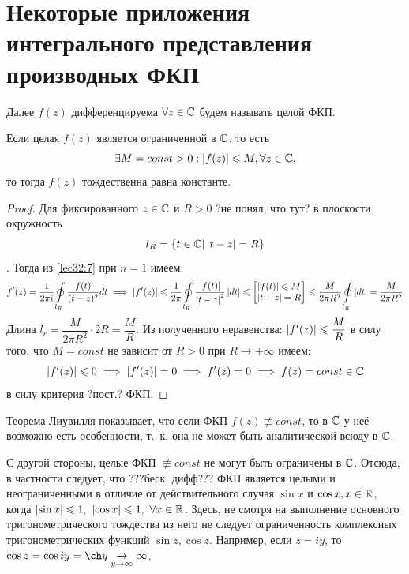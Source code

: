 \documentclass[../../main.tex]{subfiles}
\begin{document}
\section{Некоторые приложения интегрального
	представления производных ФКП}

Далее $f(z)$ дифференцируема $\forall z \in \mathbb{C}$
будем называть целой ФКП.
\begin{thm}[Диувилля]
	Если целая $f(z)$ является ограниченной в $\mathbb{C}$,
	то есть
	\begin{equation}
	\label{lec33:11}
	\exists M = const > 0 : \left|{f(z)}\right|
	\leqslant M, \forall z \in \mathbb{C}, 
	\end{equation}
	то тогда $f(z)$ тождественна равна константе.
	
\end{thm}
	
\begin{proof}
	Для фиксированного $ z \in \mathbb{C} $ и $ R > 0 $ ?не понял, что тут? 
	в плоскости  окружность 
	\[ l_R = \{ t \in \mathbb{C} | \left|{t - z}\right| = R\} \]. 
	Тогда из \eqref{lec32:7} при $ n = 1 $ имеем:
	\[
	f'(z) = \dfrac{1}{2\pi i} \oint\limits_{l_R} 
	\dfrac{f(t)}{(t - z)^2} dt \implies
	\left|{f'(z)}\right| \leqslant \dfrac{1}{2\pi}
	\oint\limits_{l_R} \dfrac{\left|{f(t)}\right|}{\left|{t - z}\right|^2}
	\left|{dt}\right| \leqslant
	\begin{bmatrix}
		\left|{f(t)}\right| \leqslant M \\
		\left|{t - z}\right| = R
	\end{bmatrix} \leqslant \dfrac{M}{2\pi R^2}
	\oint\limits_{l_R} \left|{dt}\right| =
	\dfrac{M}{2\pi R^2}
	\]
	Длина $ l_r = \dfrac{M}{2\pi R^2} \cdot 2R = \dfrac{M}{R} $.
	Из полученного неравенства: $ \left|{f'(z)}\right| \leqslant 
	\dfrac{M}{R} $ в силу того, что $ M = const $ не 
	зависит от $ R > 0 $ при $ R \to +\infty $ имеем:
	\[
	\left|{f'(z)}\right| \leqslant 0 \implies 
	\left|{f'(z)}\right| = 0 \implies 
	f'(z) = 0 \implies 
	f(z) = const \in \mathbb{C}
	\] в силу критерия ?пост.? ФКП.
\end{proof}
\begin{rem}
	Теорема Лиувилля показывает, что если ФКП $ f(z) \not\equiv const $,
	то в $ \mathbb{C} $ у неё возможно есть особенности, т.~к.
	она не может быть аналитической всюду в $ \mathbb{C} $.
\end{rem}
С другой стороны, целые ФКП $ \not\equiv const $ не могут быть ограничены в $ \mathbb{C} $.
Отсюда, в частности следует, что ???беск. дифф??? ФКП
является целыми и неограниченными в отличие от действительного 
случая $ \sin x $ и $ \cos x, x \in \mathbb{R} $, когда $ \abs{\sin x} \leq 1,\ 
\abs{\cos x} \leq 1,\ \forall x \in \R $. 
Здесь, не смотря на выполнение основного тригонометрического тождества 
из него не следует ограниченность комплексных тригонометрических функций $ 
\sin z,\cos z $. Например, если $ z = iy $, то
$ \cos z = \cos iy = \ch y
\underset{y \to \infty}{\to} \infty$.
\end{document}
